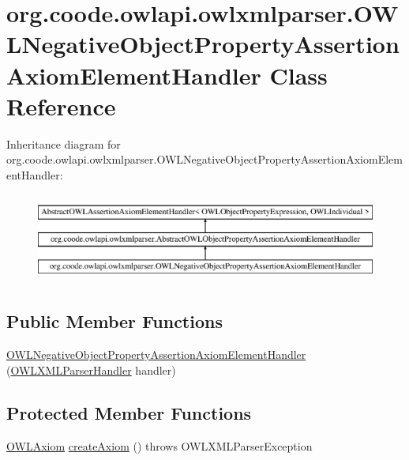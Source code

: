 \hypertarget{classorg_1_1coode_1_1owlapi_1_1owlxmlparser_1_1_o_w_l_negative_object_property_assertion_axiom_element_handler}{\section{org.\-coode.\-owlapi.\-owlxmlparser.\-O\-W\-L\-Negative\-Object\-Property\-Assertion\-Axiom\-Element\-Handler Class Reference}
\label{classorg_1_1coode_1_1owlapi_1_1owlxmlparser_1_1_o_w_l_negative_object_property_assertion_axiom_element_handler}
}
Inheritance diagram for org.\-coode.\-owlapi.\-owlxmlparser.\-O\-W\-L\-Negative\-Object\-Property\-Assertion\-Axiom\-Element\-Handler\-:\begin{figure}[H]
\begin{center}
\leavevmode
\includegraphics[height=2.989324cm]{classorg_1_1coode_1_1owlapi_1_1owlxmlparser_1_1_o_w_l_negative_object_property_assertion_axiom_element_handler}
\end{center}
\end{figure}
\subsection*{Public Member Functions}
\begin{DoxyCompactItemize}
\item 
\hyperlink{classorg_1_1coode_1_1owlapi_1_1owlxmlparser_1_1_o_w_l_negative_object_property_assertion_axiom_element_handler_a6933e7e70e0518c5fa5a82690e81a60d}{O\-W\-L\-Negative\-Object\-Property\-Assertion\-Axiom\-Element\-Handler} (\hyperlink{classorg_1_1coode_1_1owlapi_1_1owlxmlparser_1_1_o_w_l_x_m_l_parser_handler}{O\-W\-L\-X\-M\-L\-Parser\-Handler} handler)
\end{DoxyCompactItemize}
\subsection*{Protected Member Functions}
\begin{DoxyCompactItemize}
\item 
\hyperlink{interfaceorg_1_1semanticweb_1_1owlapi_1_1model_1_1_o_w_l_axiom}{O\-W\-L\-Axiom} \hyperlink{classorg_1_1coode_1_1owlapi_1_1owlxmlparser_1_1_o_w_l_negative_object_property_assertion_axiom_element_handler_a718300b281276ce7b93d7965ddcf1570}{create\-Axiom} ()  throws O\-W\-L\-X\-M\-L\-Parser\-Exception 
\end{DoxyCompactItemize}


